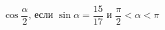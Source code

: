 \begin{ex}[type=calculate_expression]
	\begin{condition}
		\( \cos\dfrac{\alpha}{2} \), \quad если \( \sin\alpha=\dfrac{15}{17} \) и \( \dfrac{\pi}{2}<\alpha<\pi \)
	\end{condition}
\end{ex}